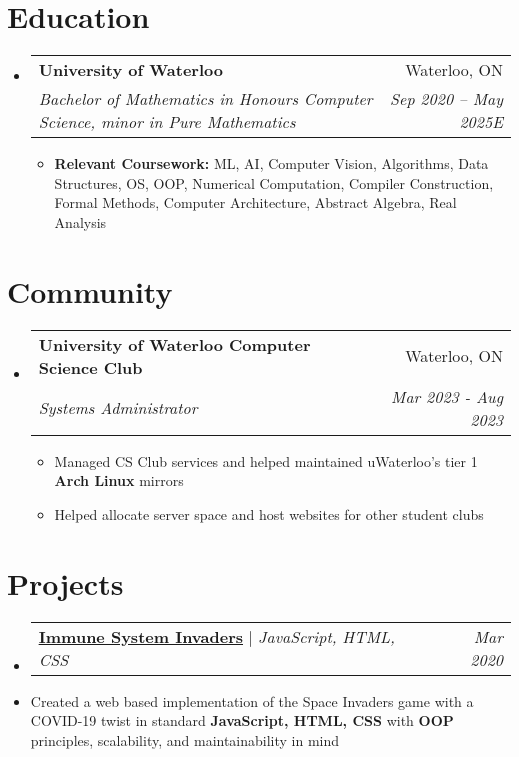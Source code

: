 \documentclass[letterpaper,11pt]{article}
\makeatletter
\newcommand{\resumeItem}[1]{
  \item\small{
    {#1 \vspace{-2pt}}
  }
}
\newcommand{\resumeSubheading}[4]{
  \vspace{-2pt}\item
    \begin{tabular*}{0.97\textwidth}[t]{l@{\extracolsep{\fill}}r}
      \textbf{#1} & #2 \\
      \textit{\small#3} & \textit{\small #4} \\
    \end{tabular*}\vspace{-7pt}
}
\newcommand{\resumeProjectHeading}[2]{
    \item
    \begin{tabular*}{0.97\textwidth}{l@{\extracolsep{\fill}}r}
      \small#1 & #2 \\
    \end{tabular*}\vspace{-7pt}
}
\newcommand{\resumeSubHeadingListStart}{\begin{itemize}[leftmargin=0.15in, label={}]}
\newcommand{\resumeSubHeadingListEnd}{\end{itemize}}
\newcommand{\resumeItemListStart}{\begin{itemize}}
\newcommand{\resumeItemListEnd}{\end{itemize}\vspace{-5pt}}
\makeatother
\begin{document}
\section{Education}
  \resumeSubHeadingListStart
    \resumeSubheading
      {University of Waterloo}{Waterloo, ON}
      {Bachelor of Mathematics in Honours Computer Science, minor in Pure Mathematics}{Sep 2020 -- May 2025E}
      \resumeItemListStart
      \resumeItem{\textbf{Relevant Coursework:} ML, AI, Computer Vision, Algorithms, Data Structures, OS, OOP, Numerical Computation, Compiler Construction, Formal Methods, Computer Architecture, Abstract Algebra, Real Analysis}
      \resumeItemListEnd
  \resumeSubHeadingListEnd


\section{Community}
    \resumeSubHeadingListStart

    \resumeSubheading
      {University of Waterloo Computer Science Club}{Waterloo, ON}
      {Systems Administrator} {Mar 2023 - Aug 2023}
      \resumeItemListStart
      \resumeItem{Managed CS Club services and helped maintained uWaterloo's tier 1 \textbf{Arch Linux} mirrors}
        \resumeItem{Helped allocate server space and host websites for other student clubs}
      \resumeItemListEnd
    
    \resumeSubHeadingListEnd



    
\section{Projects}
    \resumeSubHeadingListStart
    \resumeProjectHeading
    {\href{https://jiafengyu.github.io/ISI/game.html} {\textbf{\underline{Immune System Invaders}}} $|$ \emph{JavaScript, HTML, CSS}} {\emph{Mar 2020}}
          \item
              Created a web based implementation of the Space Invaders game with a COVID-19 twist in standard \textbf{JavaScript, HTML, CSS} with \textbf{OOP} principles, scalability, and maintainability in mind
      
    \resumeSubHeadingListEnd

%
\end{document}
